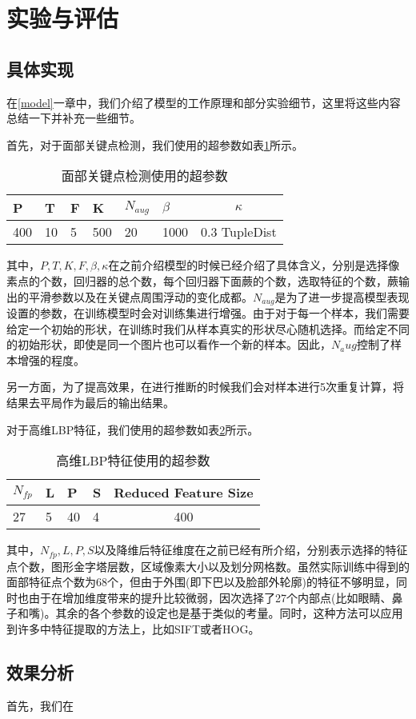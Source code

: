 \section{实验与评估}
\label{evaluation}

\subsection{具体实现}

在\ref{model}一章中，我们介绍了模型的工作原理和部分实验细节，这里将这些内容总结一下并补充一些细节。

首先，对于面部关键点检测，我们使用的超参数如表\ref{tab:esr}所示。

\begin{table}[h]
	\begin{tabularx}{\textwidth}{|X|X|X|X|X|X|c|}
		\hline
		P& T & F &  K& $N_{aug}$& $\beta$& $\kappa$\\ 
		\hline 
		400& 10 & 5  & 500 & 20 & 1000& 0.3 TupleDist\\ 
		\hline
	\end{tabularx} 
	\caption{面部关键点检测使用的超参数}
	\label{tab:esr}
\end{table}

其中，$P,T,K,F,\beta,\kappa$在之前介绍模型的时候已经介绍了具体含义，分别是选择像素点的个数，回归器的总个数，每个回归器下面蕨的个数，选取特征的个数，蕨输出的平滑参数以及在关键点周围浮动的变化成都。$N_{aug}$是为了进一步提高模型表现设置的参数，在训练模型时会对训练集进行增强。由于对于每一个样本，我们需要给定一个初始的形状，在训练时我们从样本真实的形状尽心随机选择。而给定不同的初始形状，即使是同一个图片也可以看作一个新的样本。因此，$N_aug$控制了样本增强的程度。

另一方面，为了提高效果，在进行推断的时候我们会对样本进行5次重复计算，将结果去平局作为最后的输出结果。

对于高维LBP特征，我们使用的超参数如表\ref{tab:high_dimen}所示。
\begin{table}[h]
	\begin{tabularx}{\textwidth}{|X|X|X|X|c|}
		\hline
		$N_{fp}$& L & P & S & Reduced Feature Size \\ 
		\hline 
		27 & 5 & 40  & 4 & 400\\ 
		\hline
	\end{tabularx} 
	\caption{高维LBP特征使用的超参数}
	\label{tab:high_dimen}
\end{table}

其中，$N_{fp}, L, P, S$以及降维后特征维度在之前已经有所介绍，分别表示选择的特征点个数，图形金字塔层数，区域像素大小以及划分网格数。虽然实际训练中得到的面部特征点个数为68个，但由于外围(即下巴以及脸部外轮廓)的特征不够明显，同时也由于在增加维度带来的提升比较微弱，因次选择了27个内部点(比如眼睛、鼻子和嘴)。其余的各个参数的设定也是基于类似的考量。同时，这种方法可以应用到许多中特征提取的方法上，比如SIFT或者HOG。

\subsection{效果分析}

首先，我们在